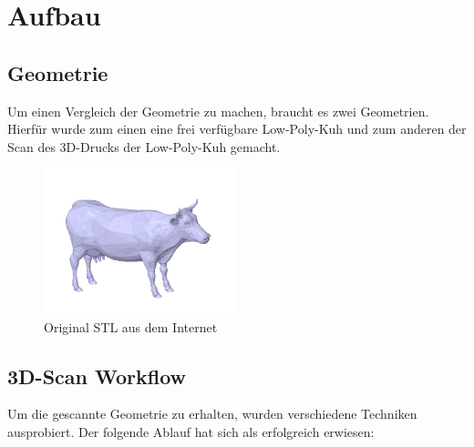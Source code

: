 \documentclass[a4paper,12pt]{article}
\begin{document}
\section{Aufbau}

\subsection{Geometrie}
Um einen Vergleich der Geometrie zu machen, braucht es zwei Geometrien. Hierfür wurde zum einen eine frei verfügbare Low-Poly-Kuh und zum anderen der Scan des 3D-Drucks der Low-Poly-Kuh gemacht.

\begin{figure}[h]
    \centering
    \includegraphics[width=0.5\textwidth]{cow.PNG}
    \caption{Original STL aus dem Internet}
    \label{fig:Orggeometry}
\end{figure}
\newpage
\subsection{3D-Scan Workflow}
Um die gescannte Geometrie zu erhalten, wurden verschiedene Techniken ausprobiert. Der folgende Ablauf hat sich als erfolgreich erwiesen:
\end{document}

